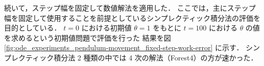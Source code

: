 続いて，ステップ幅を固定して数値解法を適用した．
ここでは，主にステップ幅を固定して使用することを前提としているシンプレクティック積分法の評価を目的としている．
$t=0$ における初期値 $\theta = 1$ をもとに $t=100$ における $\theta$ の値を求めるという初期値問題で評価を行った
結果を図
\ref{fig:ode_experiments_pendulum-movement_fixed-step-work-error}
に示す．
シンプレクティック積分法 2 種類の中では 4 次の解法（Forest4）の方が速かった．

\clearpage
